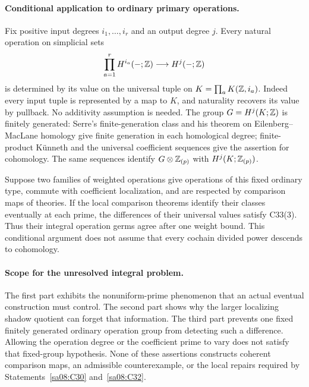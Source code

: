 \paragraph{Conditional application to ordinary primary operations.}
Fix positive input degrees $i_1,\ldots,i_r$ and an output degree $j$.
Every natural operation on simplicial sets
\[
 \prod_{a=1}^r H^{i_a}(-;\mathbb Z)\longrightarrow H^j(-;\mathbb Z)
\]
is determined by its value on the universal tuple on
$K=\prod_a K(\mathbb Z,i_a)$. Indeed every input tuple is represented
by a map to $K$, and naturality recovers its value by pullback.
No additivity assumption is needed. The group
$G=H^j(K;\mathbb Z)$ is finitely generated: Serre's finite-generation
class and his theorem on Eilenberg--MacLane homology give finite
generation in each homological degree; finite-product K\"unneth
and the universal coefficient sequences give the assertion
for cohomology\cite[Chapter I, \S6.1, p.~264; Chapter II,
\S6, Proposition~8, p.~271]{BSerre1953Classes}.
The same sequences identify
$G\otimes\mathbb Z_{(p)}$ with $H^j(K;\mathbb Z_{(p)})$.

Suppose two families of weighted operations give operations of
this fixed ordinary type, commute with coefficient localization,
and are respected by comparison maps of theories. If the local
comparison theorems identify their classes eventually at each
prime, the differences of their universal values satisfy
C33(3). Thus their integral operation germs agree after one
weight bound. This conditional argument does not assume that
every cochain divided power descends to cohomology.

\paragraph{Scope for the unresolved integral problem.}
The first part exhibits the nonuniform-prime phenomenon that an
actual eventual construction must control. The second part shows
why the larger localizing shadow quotient can forget that
information. The third part prevents one fixed finitely generated
ordinary operation group from detecting such a difference.
Allowing the operation degree or the coefficient prime to vary
does not satisfy that fixed-group hypothesis. None of these
assertions constructs coherent comparison maps, an admissible
counterexample, or the local repairs required by
Statements~\ref{sa08:C30} and~\ref{sa08:C32}.
